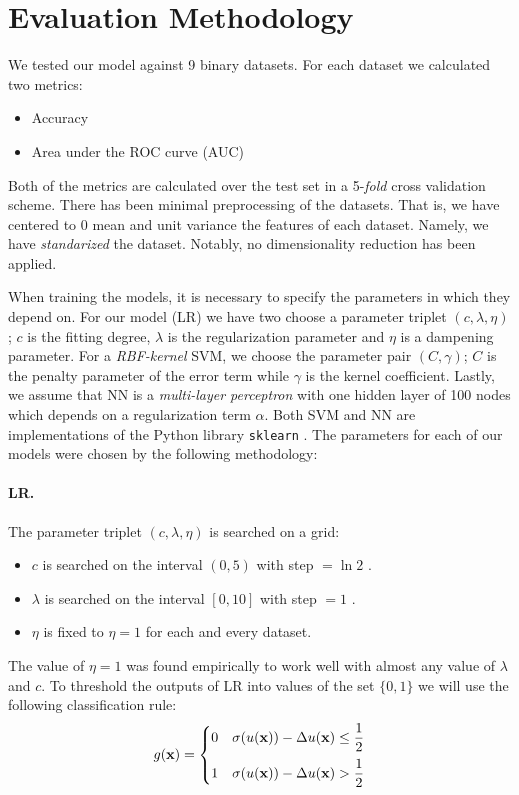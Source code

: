 \documentclass{INGUADY}
\begin{document}
\section{Evaluation Methodology}
We tested our model against 9 binary datasets. For each dataset we calculated two metrics:
\begin{itemize}
\item Accuracy
\item Area under the ROC curve (AUC) \cite{hanleyroc}
\end{itemize}
Both of the metrics are calculated over the test set in a 5-\textit{fold} cross validation scheme. There has been minimal preprocessing of the datasets. That is, we have centered to 0 mean and unit variance the features of each dataset. Namely, we have \textit{standarized} the dataset. Notably, no dimensionality reduction has been applied. 

When training the models, it is necessary to specify the parameters in which they depend on. For our model (LR) we have two choose a parameter triplet $(c, \lambda, \eta)$; $c$ is the fitting degree, $\lambda$ is the regularization parameter and $\eta$ is a dampening parameter. For a \textit{RBF-kernel} SVM, we choose the parameter pair $(C, \gamma)$; $C$ is the penalty parameter of the error term while $\gamma$ is the kernel coefficient. Lastly, we assume that NN is a \textit{multi-layer perceptron} with one hidden layer of 100 nodes which depends on a  regularization term $\alpha$. Both SVM and NN are implementations of the Python library \texttt{sklearn} \cite{sklearn}. The parameters for each of our models were chosen by the following methodology:
\paragraph{\textbf{LR.}}
The parameter triplet $(c, \lambda, \eta)$ is searched on a grid:
\begin{itemize}
\item $c$ is searched on the interval $(0, 5)$ with step $ = \ln 2$ .
 \item $\lambda$ is searched on the interval $[0, 10]$ with step $= 1$ .
 \item $\eta$ is fixed to $\eta = 1$ for each and every dataset.
\end{itemize}
The value of $\eta = 1$ was found empirically to work well with almost any value of $\lambda$ and $c$. To threshold the outputs of LR into values of the set $\{ 0, 1\}$ we will use the following classification rule:
\begin{equation*}
g(\mathbf{x}) = \begin{cases}
0 & \sigma(u(\mathbf{x})) - \Delta u(\mathbf{x}) \leq \dfrac{1}{2} \vspace{2mm} \\
1 & \sigma(u(\mathbf{x})) - \Delta u(\mathbf{x}) > \dfrac{1}{2}
\end{cases}
\end{equation*}
\end{document}
